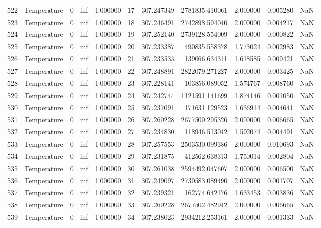 \begin{tabular}{llrrrrrrrrr}
522 & Temperature & 0 & inf & 1.000000 & 17 & 307.247349 & 2781835.410061 & 2.000000 & 0.005280 & NaN \\
523 & Temperature & 0 & inf & 1.000000 & 18 & 307.246491 & 2742898.594040 & 2.000000 & 0.004217 & NaN \\
524 & Temperature & 0 & inf & 1.000000 & 19 & 307.252140 & 2739128.554009 & 2.000000 & 0.000822 & NaN \\
525 & Temperature & 0 & inf & 1.000000 & 20 & 307.233387 & 490835.558378 & 1.773024 & 0.002983 & NaN \\
526 & Temperature & 0 & inf & 1.000000 & 21 & 307.233533 & 139066.634311 & 1.618585 & 0.009421 & NaN \\
527 & Temperature & 0 & inf & 1.000000 & 22 & 307.248891 & 2822079.271227 & 2.000000 & 0.003425 & NaN \\
528 & Temperature & 0 & inf & 1.000000 & 23 & 307.228141 & 103856.089052 & 1.574767 & 0.008760 & NaN \\
529 & Temperature & 0 & inf & 1.000000 & 24 & 307.242744 & 1121591.141699 & 1.874146 & 0.001050 & NaN \\
530 & Temperature & 0 & inf & 1.000000 & 25 & 307.237091 & 171631.129523 & 1.636914 & 0.004641 & NaN \\
531 & Temperature & 0 & inf & 1.000000 & 26 & 307.260228 & 2677500.295326 & 2.000000 & 0.006665 & NaN \\
532 & Temperature & 0 & inf & 1.000000 & 27 & 307.234830 & 118946.513042 & 1.592074 & 0.004491 & NaN \\
533 & Temperature & 0 & inf & 1.000000 & 28 & 307.257553 & 2503530.099386 & 2.000000 & 0.010693 & NaN \\
534 & Temperature & 0 & inf & 1.000000 & 29 & 307.231875 & 412562.638313 & 1.750014 & 0.002804 & NaN \\
535 & Temperature & 0 & inf & 1.000000 & 30 & 307.261038 & 2594492.047607 & 2.000000 & 0.006500 & NaN \\
536 & Temperature & 0 & inf & 1.000000 & 31 & 307.249097 & 2730583.089490 & 2.000000 & 0.001707 & NaN \\
537 & Temperature & 0 & inf & 1.000000 & 32 & 307.239321 & 162774.642176 & 1.633453 & 0.003836 & NaN \\
538 & Temperature & 0 & inf & 1.000000 & 33 & 307.260228 & 2677502.482942 & 2.000000 & 0.006665 & NaN \\
539 & Temperature & 0 & inf & 1.000000 & 34 & 307.238023 & 2934212.253161 & 2.000000 & 0.001333 & NaN \\

\end{tabular}
